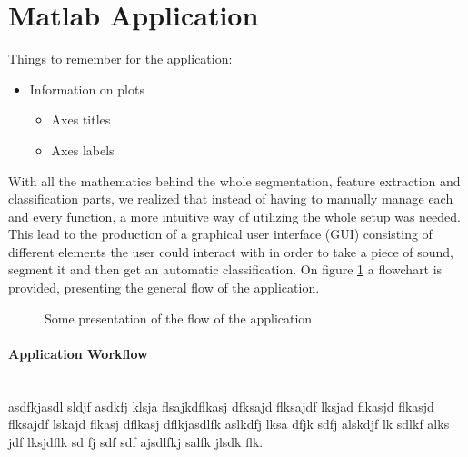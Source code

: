 \section{Matlab Application}
Things to remember for the application:
\begin{itemize}
	\item Information on plots
	\begin{itemize}
		\item Axes titles
		\item Axes labels
	\end{itemize}
	
\end{itemize}

With all the mathematics behind the whole segmentation, feature extraction and classification parts, we realized that instead of having to manually manage each and every function, a more intuitive way of utilizing the whole setup was needed. This lead to the production of a graphical user interface (GUI) consisting of different elements the user could interact with in order to take a piece of sound, segment it and then get an automatic classification. On figure \ref{app-flowchart} a flowchart is provided, presenting the general flow of the application.

\begin{figure}
\caption{Some presentation of the flow of the application}
\label{app-flowchart}
\end{figure}


\paragraph{Application Workflow} \hspace{0pt} \\
asdfkjasdl sldjf asdkfj klsja flsajkdflkasj dfksajd flksajdf lksjad flkasjd flkasjd flksajdf lskajd flkasj dflkasj dflkjasdlfk aslkdfj lksa dfjk sdfj alskdjf lk sdlkf alks jdf lksjdflk sd fj sdf sdf ajsdlfkj salfk jlsdk flk.